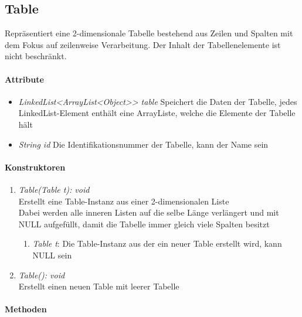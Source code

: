 \subsection{Table}
Repräsentiert eine 2-dimensionale Tabelle bestehend aus Zeilen und Spalten mit dem Fokus auf zeilenweise Verarbeitung. Der Inhalt der Tabellenelemente ist nicht beschränkt.


\paragraph{Attribute}

\begin{itemize}[-]
	\item \textit{LinkedList<ArrayList<Object>> table} Speichert die Daten der Tabelle, jedes LinkedList-Element enthält eine ArrayListe, welche die Elemente der Tabelle hält
	\item \textit{String id}	Die Identifikationsnummer der Tabelle, kann der Name sein
\end{itemize}

\paragraph{Konstruktoren}

\begin{enumerate}[+]
	\item \textit{Table(Table t): void} \\
	Erstellt eine Table-Instanz aus einer 2-dimensionalen Liste \\
	Dabei werden alle inneren Listen auf die selbe Länge verlängert und mit NULL aufgefüllt, damit die Tabelle immer gleich viele Spalten besitzt	
	\begin{enumerate}[$\bullet$]
		\item \textit{Table t}: Die Table-Instanz aus der ein neuer Table erstellt wird, kann NULL sein
	\end{enumerate}
	\vspace{-0.2cm}
	\item \textit{Table(): void} \\
	Erstellt einen neuen Table mit leerer Tabelle
\end{enumerate}
			
\paragraph{Methoden}

